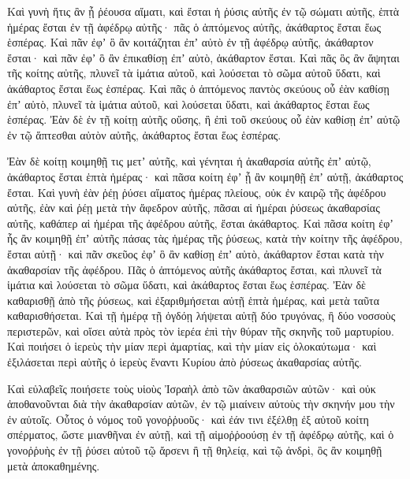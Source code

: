 {Καὶ γυνὴ ἥτις ἂν ᾖ ῥέουσα αἵματι, καὶ ἔσται ἡ ῥύσις αὐτῆς ἐν τῷ σώματι αὐτῆς, ἑπτὰ ἡμέρας ἔσται ἐν τῇ ἀφέδρῳ αὐτῆς· πᾶς ὁ ἁπτόμενος αὐτῆς, ἀκάθαρτος ἔσται ἕως ἑσπέρας.
Καὶ πᾶν ἐφʼ ὃ ἂν κοιτάζηται ἐπʼ αὐτὸ ἐν τῇ ἀφέδρῳ αὐτῆς, ἀκάθαρτον ἔσται· καὶ πᾶν ἐφʼ ὃ ἂν ἐπικαθίσῃ ἐπʼ αὐτὸ, ἀκάθαρτον ἔσται.
Καὶ πᾶς ὃς ἂν ἅψηται τῆς κοίτης αὐτῆς, πλυνεῖ τὰ ἱμάτια αὐτοῦ, καὶ λούσεται τὸ σῶμα αὐτοῦ ὕδατι, καὶ ἀκάθαρτος ἔσται ἕως ἑσπέρας.
Καὶ πᾶς ὁ ἁπτόμενος παντὸς σκεύους οὗ ἐὰν καθίσῃ ἐπʼ αὐτὸ, πλυνεῖ τὰ ἱμάτια αὐτοῦ, καὶ λούσεται ὕδατι, καὶ ἀκάθαρτος ἔσται ἕως ἑσπέρας.
Ἐὰν δὲ ἐν τῇ κοίτῃ αὐτῆς οὔσης, ἢ ἐπὶ τοῦ σκεύους οὗ ἐὰν καθίσῃ ἐπʼ αὐτῷ ἐν τῷ ἅπτεσθαι αὐτὸν αὐτῆς, ἀκάθαρτος ἔσται ἕως ἑσπέρας.
\par }{\PP {}Ἐὰν δὲ κοίτῃ κοιμηθῇ τις μετʼ αὐτῆς, καὶ γένηται ἡ ἀκαθαρσία αὐτῆς ἐπʼ αὐτῷ, ἀκάθαρτος ἔσται ἑπτὰ ἡμέρας· καὶ πᾶσα κοίτη ἐφʼ ᾗ ἂν κοιμηθῇ ἐπʼ αὐτῇ, ἀκάθαρτος ἔσται.
Καὶ γυνὴ ἐὰν ῥέῃ ῥύσει αἵματος ἡμέρας πλείους, οὐκ ἐν καιρῷ τῆς ἀφέδρου αὐτῆς, ἐὰν καὶ ῥέῃ μετὰ τὴν ἄφεδρον αὐτῆς, πᾶσαι αἱ ἡμέραι ῥύσεως ἀκαθαρσίας αὐτῆς, καθάπερ αἱ ἡμέραι τῆς ἀφέδρου αὐτῆς, ἔσται ἀκάθαρτος.
Καὶ πᾶσα κοίτη ἐφʼ ἧς ἂν κοιμηθῇ ἐπʼ αὐτῆς πάσας τὰς ἡμέρας τῆς ῥύσεως, κατὰ τὴν κοίτην τῆς ἀφέδρου, ἔσται αὐτῇ· καὶ πᾶν σκεῦος ἐφʼ ὃ ἂν καθίσῃ ἐπʼ αὐτὸ, ἀκάθαρτον ἔσται κατὰ τὴν ἀκαθαρσίαν τῆς ἀφέδρου.
Πᾶς ὁ ἁπτόμενος αὐτῆς ἀκάθαρτος ἔσται, καὶ πλυνεῖ τὰ ἱμάτια καὶ λούσεται τὸ σῶμα ὕδατι, καὶ ἀκάθαρτος ἔσται ἕως ἑσπέρας.
Ἐὰν δὲ καθαρισθῇ ἀπὸ τῆς ῥύσεως, καὶ ἐξαριθμήσεται αὐτῇ ἑπτὰ ἡμέρας, καὶ μετὰ ταῦτα καθαρισθήσεται.
Καὶ τῇ ἡμέρᾳ τῇ ὀγδόῃ λήψεται αὑτῇ δύο τρυγόνας, ἢ δύο νοσσοὺς περιστερῶν, καὶ οἴσει αὐτὰ πρὸς τὸν ἱερέα ἐπὶ τὴν θύραν τῆς σκηνῆς τοῦ μαρτυρίου.
Καὶ ποιήσει ὁ ἱερεὺς τὴν μίαν περὶ ἁμαρτίας, καὶ τὴν μίαν εἰς ὁλοκαύτωμα· καὶ ἐξιλάσεται περὶ αὐτῆς ὁ ἱερεὺς ἔναντι Κυρίου ἀπὸ ῥύσεως ἀκαθαρσίας αὐτῆς.
\par }{\PP {}Καὶ εὐλαβεῖς ποιήσετε τοὺς υἱοὺς Ἰσραὴλ ἀπὸ τῶν ἀκαθαρσιῶν αὐτῶν· καὶ οὐκ ἀποθανοῦνται διὰ τὴν ἀκαθαρσίαν αὐτῶν, ἐν τῷ μιαίνειν αὐτοὺς τὴν σκηνήν μου τὴν ἐν αὐτοῖς.
Οὗτος ὁ νόμος τοῦ γονοῤῥυοῦς· καὶ ἐάν τινι ἐξέλθῃ ἐξ αὐτοῦ κοίτη σπέρματος, ὥστε μιανθῆναι ἐν αὐτῇ,
καὶ τῇ αἱμοῤῥοούσῃ ἐν τῇ ἀφέδρῳ αὐτῆς, καὶ ὁ γονοῤῥυὴς ἐν τῇ ῥύσει αὐτοῦ τῷ ἄρσενι ἢ τῇ θηλείᾳ, καὶ τῷ ἀνδρὶ, ὃς ἂν κοιμηθῇ μετὰ ἀποκαθημένης.

}

